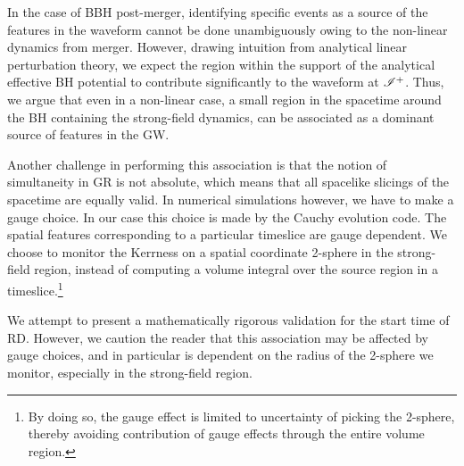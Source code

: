 
In the case of BBH post-merger, identifying specific events as a source of the features in the waveform cannot be done unambiguously owing to the non-linear dynamics from merger. However, drawing intuition from analytical linear perturbation theory, we expect the region within the support of the analytical effective BH potential to contribute significantly to the waveform at $\mathscr{I^+}$. Thus, we argue that even in a non-linear case, a small region in the spacetime around the BH containing the strong-field dynamics, can be associated as a dominant source of features in the GW. 

Another challenge in performing this association is that the notion of simultaneity in GR is not absolute, which means that all spacelike slicings of the spacetime are equally valid. In numerical simulations however, we have to make a gauge choice. In our case this choice is made by the Cauchy evolution code. The spatial features corresponding to a particular timeslice are gauge dependent. We choose to monitor the Kerrness on a spatial coordinate 2-sphere in the strong-field region, instead of computing a volume integral over the source region in a timeslice.\footnote{By doing so, the gauge effect is limited to uncertainty of picking the 2-sphere, thereby avoiding contribution of gauge effects through the entire volume region.}


We attempt to present a mathematically rigorous validation for the start time of RD. However, we caution the reader that this association may be affected by gauge choices, and in particular is dependent on the radius of the 2-sphere we monitor, especially in the strong-field region.



